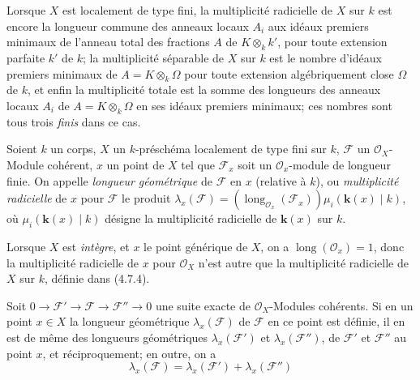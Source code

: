 Lorsque $X$ est localement de type fini, la multiplicité radicielle de $X$ sur
$k$ est encore la longueur commune des anneaux locaux $A_i$ aux idéaux
premiers minimaux de l'anneau total des fractions $A$ de $K\otimes_k k'$,
pour toute extension parfaite $k'$ de $k$; la multiplicité séparable de $X$
sur $k$ est le nombre d'idéaux premiers minimaux de $A=K\otimes_k\Omega$ pour
toute extension algébriquement close $\Omega$ de $k$, et enfin la multiplicité
totale est la somme des longueurs des anneaux locaux $A_i$ de
$A=K\otimes_k\Omega$ en ses idéaux premiers minimaux; ces nombres sont tous
trois \emph{finis} dans ce cas.

\begin{definition}[4.7.5]
\label{IV.2.4.7.5-fr}
Soient $k$ un corps, $X$ un $k$-préschéma localement de type fini sur $k$,
$\mathscr F$ un $\mathcal O_X$-Module cohérent, $x$ un point de $X$ tel que
$\mathscr F_x$ soit un $\mathcal O_x$-module de longueur finie. On appelle
\emph{longueur géométrique} de $\mathscr F$ en $x$ (relative à $k$), ou
\emph{multiplicité radicielle} de $x$ pour $\mathscr F$ le produit
$\lambda_x(\mathscr F)
=(\operatorname{long}_{\mathcal O_x}(\mathscr F_x))\mu_i(\boldsymbol{k}(x)\mid k)$,
où $\mu_i(\boldsymbol{k}(x)\mid k)$ désigne la multiplicité radicielle de $\boldsymbol{k}(x)$ sur $k$.
\end{definition}

Lorsque $X$ est \emph{intègre}, et $x$ le point générique de $X$, on a
$\operatorname{long}(\mathcal O_x)=1$, donc la multiplicité radicielle de $x$
pour $\mathcal O_X$ n'est autre que la multiplicité radicielle de $X$ sur $k$,
définie dans (4.7.4).


\begin{proposition}[4.7.6]
\label{IV.2.4.7.6-fr}
Soit
$0\longrightarrow\mathscr F'\longrightarrow\mathscr F
\longrightarrow\mathscr F''\longrightarrow0$
une suite exacte de $\mathcal O_X$-Modules cohérents. Si en un point $x\in X$
la longueur géométrique $\lambda_x(\mathscr F)$ de $\mathscr F$ en ce point
est définie, il en est de même des longueurs géométriques
$\lambda_x(\mathscr F')$ et $\lambda_x(\mathscr F'')$, de $\mathscr F'$ et
$\mathscr F''$ au point $x$, et réciproquement; en outre, on a
\begin{equation}
\lambda_x(\mathscr F)=\lambda_x(\mathscr F')+\lambda_x(\mathscr F'')
\tag{4.7.6.1}
\label{IV.2.4.7.6.1-fr}
\end{equation}
\end{proposition}


